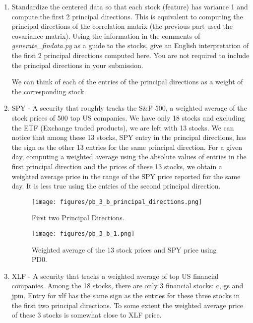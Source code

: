 \documentclass[12pt,twoside]{article}
\begin{document}
\begin{enumerate}
\begin{enumerate}
  \item Standardize the centered data so that each stock (feature) has
    variance 1 and compute the first 2 principal directions.  This is
    equivalent to computing the principal directions of the
    correlation matrix (the previous part used the covariance
    matrix).  Using the information in the comments of
   \emph{generate\_findata.py} as a guide to the stocks, 
    give an English interpretation of the first 2 principal directions
    computed here. 
    You are not required to include the principal directions in
    your submission.
     
    We can think of each of the entries of the principal directions as a weight of the corresponding stock.  
    	\bi
    		\item SPY - A security that roughly tracks the S\&P 500, a weighted average of the stock prices of 500 top US companies.
		We have only 18 stocks and excluding the ETF (Exchange traded products), we are left with 13 stocks. 
		We can notice that among these 13 stocks, SPY entry in the principal directions, has the sign as the other 13 entries
		for the same principal direction.
		For a given day, computing a weighted average using the absolute values of entries in the first principal direction and the prices of these 13 stocks, 
		we obtain a weighted average price in the range of the SPY price reported for the same day. It is less true using the entries of the second principal direction.

		\begin{figure}[H]
			\centering
			\texttt{[image: figures/pb\_3\_b\_principal\_directions.png]}
			\caption{First two Principal Directions.}
			\label{fig3}
		\end{figure}

		\begin{figure}[H]
			\centering
			\texttt{[image: figures/pb\_3\_b\_1.png]}
			\caption{Weighted average of the 13 stock prices and SPY price using PD0.}
			\label{fig2}
		\end{figure}
					
		\item  XLF -  A security that tracks a weighted average of top US financial companies.
		Among the 18 stocks, there are only 3 financial stocks: c, gs and jpm. Entry for xlf has the same sign as the entries for these three stocks in the first two 
		principal directions. To some extent the weighted average price of these 3 stocks is somewhat close to XLF price.
		

\end{enumerate}
\end{enumerate}
\end{document}
